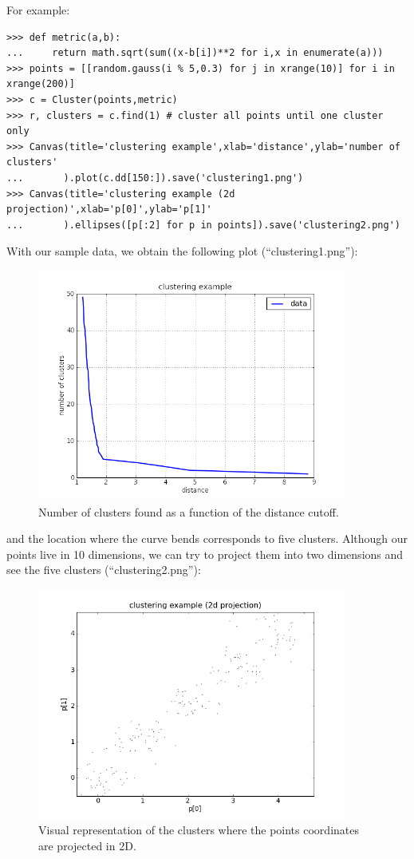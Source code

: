 \documentclass[justified,sixbynine]{tufte-book}
\def\ft{\small\tt}
\theoremstyle{plain}%
\theoremstyle{definition}
\theoremstyle{remark}
\begin{document}
\begin{fullwidth}
For example:

\begin{lstlisting}[caption={in file: {\ft nlib.py}}]
>>> def metric(a,b):
...     return math.sqrt(sum((x-b[i])**2 for i,x in enumerate(a)))
>>> points = [[random.gauss(i % 5,0.3) for j in xrange(10)] for i in xrange(200)]
>>> c = Cluster(points,metric)
>>> r, clusters = c.find(1) # cluster all points until one cluster only
>>> Canvas(title='clustering example',xlab='distance',ylab='number of clusters'
...       ).plot(c.dd[150:]).save('clustering1.png')
>>> Canvas(title='clustering example (2d projection)',xlab='p[0]',ylab='p[1]'
...       ).ellipses([p[:2] for p in points]).save('clustering2.png')
\end{lstlisting}

With our sample data, we obtain the following plot (``clustering1.png''):

\begin{figure}[ht]
\centering\includegraphics[width=4in]{images/clustering1.png}
\caption{Number of clusters found as a function of the distance cutoff.}
\end{figure}

and the location where the curve bends corresponds to five clusters. Although our points live in 10 dimensions, we can try to project them into two dimensions and see the five clusters (``clustering2.png''):

\begin{figure}[ht]
\centering\includegraphics[width=4in]{images/clustering2.png}
\caption{Visual representation of the clusters where the points coordinates are projected in 2D.}
\end{figure}


\end{fullwidth}
\end{document}
